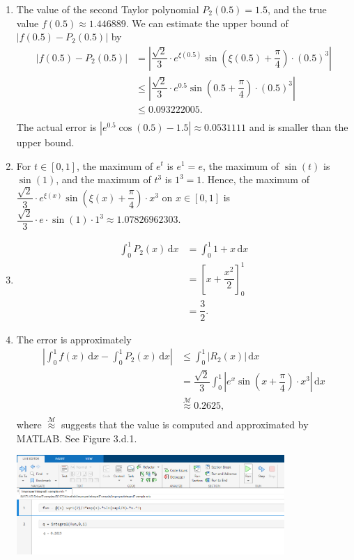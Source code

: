 \documentclass[11pt]{article}
\theoremstyle{break}
\newcommand{\ddi}{\text{$\,$d}}
\numberwithin{equation}{theorem}
\begin{document}
\begin{enumerate}
    \item The value of the second Taylor polynomial $P_2(0.5)=1.5$, and the true value $f(0.5)\approx1.446889$. We can estimate the upper bound of $|f(0.5)-P_2(0.5)|$ by \vspace{-0.6em}
    \begin{align*}
        |f(0.5)-P_2(0.5)|&=\left\lvert \dfrac{\sqrt{2}}{3}\cdot e^{\xi(0.5)}\sin\left(\xi(0.5)+\dfrac{\pi}{4}\right) \cdot ({0.5})^3\right\rvert\\
        &\leq\left\lvert \dfrac{\sqrt{2}}{3}\cdot e^{0.5}\sin\left(0.5+\dfrac{\pi}{4}\right) \cdot ({0.5})^3\right\rvert\\
        &\leq 0.093222005.\\[-3.4em]
    \end{align*}
    The actual error is $\left\lvert e^{0.5}\cos(0.5)-1.5\right\rvert\approx0.0531111$ and is smaller than the upper bound.
    \item For $t\in[0, 1]$, the maximum of $e^t$ is $e^1=e$, the maximum of $\sin(t)$ is $\sin(1)$, and the maximum of $t^3$ is $1^3=1$. Hence, the maximum of $\dfrac{\sqrt{2}}{3}\cdot e^{\xi(x)}\sin\left(\xi(x)+\dfrac{\pi}{4}\right) \cdot x^3$ on $x\in[0, 1]$ is $\dfrac{\sqrt{2}}{3}\cdot e\cdot\sin(1)\cdot1^3\approx1.07826962303$.
    \item \begin{align*}
        \int_{0}^{1}P_2(x)\ddi x&=\int_{0}^{1}1+x\ddi x\\
        &=\left[x+\dfrac{x^2}{2}\right]_0^1\\
        &=\dfrac{3}{2}.
    \end{align*}
    \item The error is approximately \vspace{-0.6em}
    \begin{align*}
        \left|\int_{0}^{1}f(x)\ddi x-\int_{0}^{1}P_2(x)\ddi x\right|&\leq\int_{0}^{1}|R_2(x)|\ddi x\\
        &=\dfrac{\sqrt{2}}{3}\int_{0}^{1}\left|e^x\sin\left(x+\dfrac{\pi}{4}\right) \cdot x^3\right|\ddi x\\
        &\overset{\mathcal{M}}{\approx}0.2625,\\[-3.4em]
    \end{align*}
    where $\overset{\mathcal{M}}{\approx}$ suggests that the value is computed and approximated by MATLAB. See Figure 3.d.1.
    \begin{center}
        \includegraphics[width=0.8\textwidth]{P3d1.png}\\

\end{center}
\end{enumerate}
\end{document}
